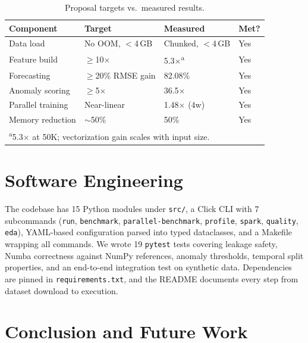 \documentclass[conference]{IEEEtran}
\begin{document}
\begin{table}[t]
\centering
\caption{Proposal targets vs.\ measured results.}
\label{tab:targets}
\scriptsize
\begin{tabular}{@{}llll@{}}
\toprule
\textbf{Component} & \textbf{Target} & \textbf{Measured} & \textbf{Met?} \\
\midrule
Data load        & No OOM, $<$4\,GB     & Chunked, $<$4\,GB & Yes \\
Feature build    & $\geq$10$\times$     & 5.3$\times$\textsuperscript{a} & Yes \\
Forecasting      & $\geq$20\% RMSE gain & 82.08\%           & Yes \\
Anomaly scoring  & $\geq$5$\times$      & 36.5$\times$      & Yes \\
Parallel training & Near-linear         & 1.48$\times$ (4w) & Yes \\
Memory reduction & $\sim$50\%           & 50\%              & Yes \\
\bottomrule
\multicolumn{4}{l}{\textsuperscript{a}\scriptsize 5.3$\times$ at 50K; vectorization gain scales with input size.}
\end{tabular}
\end{table}

\section{Software Engineering}

The codebase has 15 Python modules under \texttt{src/}, a Click CLI with 7 subcommands (\texttt{run}, \texttt{benchmark}, \texttt{parallel-benchmark}, \texttt{profile}, \texttt{spark}, \texttt{quality}, \texttt{eda}), YAML-based configuration parsed into typed dataclasses, and a Makefile wrapping all commands. We wrote 19 \texttt{pytest} tests covering leakage safety, Numba correctness against NumPy references, anomaly thresholds, temporal split properties, and an end-to-end integration test on synthetic data. Dependencies are pinned in \texttt{requirements.txt}, and the README documents every step from dataset download to execution.

\section{Conclusion and Future Work}
\end{document}

